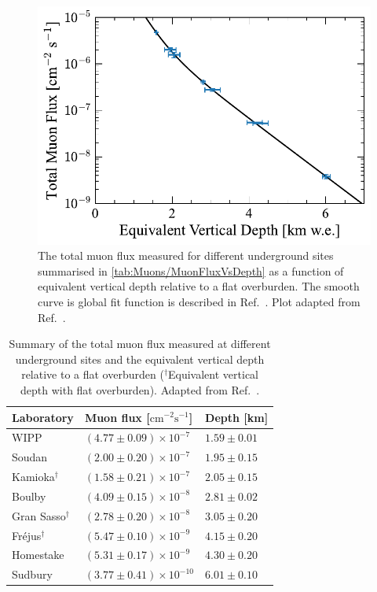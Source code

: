 \begin{figure}[ht!]
    \centering
    \includegraphics[width=0.7\linewidth]{figures/Muons/Flux_Depth_Plot.pdf}
    \caption{The total muon flux measured for different underground sites summarised in \autoref{tab:Muons/MuonFluxVsDepth} as a function of equivalent vertical depth relative to a flat overburden. The smooth curve is global fit function is described in Ref.~\cite{mei}. Plot adapted from Ref.~\cite{mei}.}
    \label{fig:Muons/MuonFluxVsDepth}
\end{figure}

\begin{table}[ht!]
    \centering
    \caption{Summary of the total muon flux measured at different underground sites and the equivalent vertical depth relative to a flat overburden ($^\dagger$Equivalent vertical depth with flat overburden). Adapted from Ref.~\cite{mei}.}
    \label{tab:Muons/MuonFluxVsDepth}
    \begin{tabular}{lll}
        \hline\hline
        \textbf{Laboratory} & \textbf{Muon flux [$\text{cm}^{-2}\text{s}^{-1}$]}&\textbf{Depth [km]}\\
        \hline
        WIPP & $(4.77 \pm 0.09) \times 10^{-7}$ & $1.59 \pm 0.01$ \\
        Soudan & $(2.00 \pm 0.20) \times 10^{-7}$ & $1.95 \pm 0.15$ \\
        Kamioka$^\dagger$ & $(1.58 \pm 0.21) \times 10^{-7}$ & $2.05 \pm 0.15$ \\
        Boulby & $(4.09 \pm 0.15) \times 10^{-8}$ & $2.81 \pm 0.02$ \\
        Gran Sasso$^\dagger$& $(2.78 \pm 0.20) \times 10^{-8}$ & $3.05 \pm 0.20$ \\
        Fréjus$^\dagger$ & $(5.47 \pm 0.10) \times 10^{-9}$ & $4.15 \pm 0.20$ \\
        Homestake & $(5.31 \pm 0.17) \times 10^{-9}$ & $4.30 \pm 0.20$ \\
        Sudbury & $(3.77 \pm 0.41) \times 10^{-10}$ & $6.01 \pm 0.10$ \\
        \hline\hline
    \end{tabular}
\end{table}

